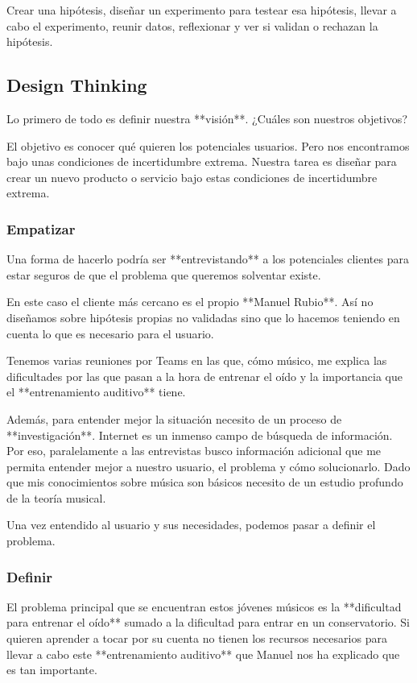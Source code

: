 \documentclass[12pt,twoside,titlepage]{report}
\begin{document}
Crear una hipótesis, diseñar un experimento para testear esa hipótesis, llevar a cabo el experimento, reunir datos, reflexionar y ver si validan o rechazan la hipótesis.

\subsection{Design Thinking}

Lo primero de todo es definir nuestra **visión**. ¿Cuáles son nuestros objetivos?

El objetivo es conocer qué quieren los potenciales usuarios. Pero nos encontramos bajo unas condiciones de incertidumbre extrema. Nuestra tarea es diseñar para crear un nuevo producto o servicio bajo estas condiciones de incertidumbre extrema.

\subsubsection{Empatizar}

Una forma de hacerlo podría ser **entrevistando** a los potenciales clientes para estar seguros de que el problema que queremos solventar existe.

En este caso el cliente más cercano es el propio **Manuel Rubio**. Así no diseñamos sobre hipótesis propias no validadas sino que lo hacemos teniendo en cuenta lo que es necesario para el usuario.

Tenemos varias reuniones por Teams en las que, cómo músico, me explica las dificultades por las que pasan a la hora de entrenar el oído y la importancia que el **entrenamiento auditivo** tiene.

Además, para entender mejor la situación necesito de un proceso de **investigación**. Internet es un inmenso campo de búsqueda de información. Por eso, paralelamente a las entrevistas busco información adicional que me permita entender mejor a nuestro usuario, el problema y cómo solucionarlo. Dado que mis conocimientos sobre música son básicos necesito de un estudio profundo de la teoría musical. 

Una vez entendido al usuario y sus necesidades, podemos pasar a definir el problema.

\subsubsection{Definir}

El problema principal que se encuentran estos jóvenes músicos es la **dificultad para entrenar el oído** sumado a la dificultad para entrar en un conservatorio. Si quieren aprender a tocar por su cuenta no tienen los recursos necesarios para llevar a cabo este **entrenamiento auditivo** que Manuel nos ha explicado que es tan importante.
\end{document}
